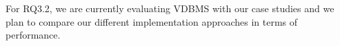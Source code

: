 %
%

For RQ3.2, we are currently evaluating VDBMS with our case studies and we plan
to compare our different implementation approaches in terms of performance.
 
 
%
%
%
%
